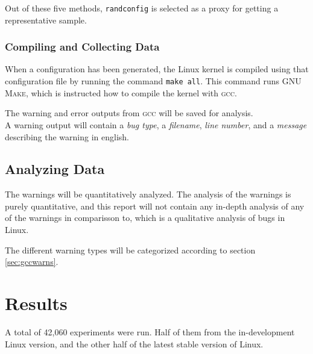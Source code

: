 \documentclass[a4paper,11pt]{report}
\newcommand{\textcode}[1]{\fboxsep=1pt\texttt{\colorbox{gray!20}{#1}}}
\begin{document}
Out of these five methods, \texttt{randconfig} is selected as a proxy for 
getting a representative sample.

            \subsection{Compiling and Collecting Data}

When a configuration has been generated, the Linux kernel is compiled using 
that configuration file by running the command \textcode{make all}. This 
command runs \textsc{GNU Make}, which is instructed how to compile the kernel with
\textsc{gcc}.

The warning and error outputs from \textsc{gcc} will be saved for analysis.
\\

A warning output will contain a \emph{bug type}, a \emph{filename}, \emph{line 
number}, and a \emph{message} describing the warning in english.


            \section{Analyzing Data}
The warnings will be quantitatively analyzed.  The analysis of the warnings is 
purely quantitative, and this report will not contain any in-depth analysis of 
any of the warnings in comparisson to\cite{42bugs}, which is a qualitative 
analysis of bugs in Linux.

The different warning types will be categorized according to section 
\ref{sec:gccwarns}.


\newpage
\chapter{Results}

A total of 42,060 experiments were run. Half of them from the in-development 
Linux version, and the other half of the latest stable version of Linux.
\end{document}
